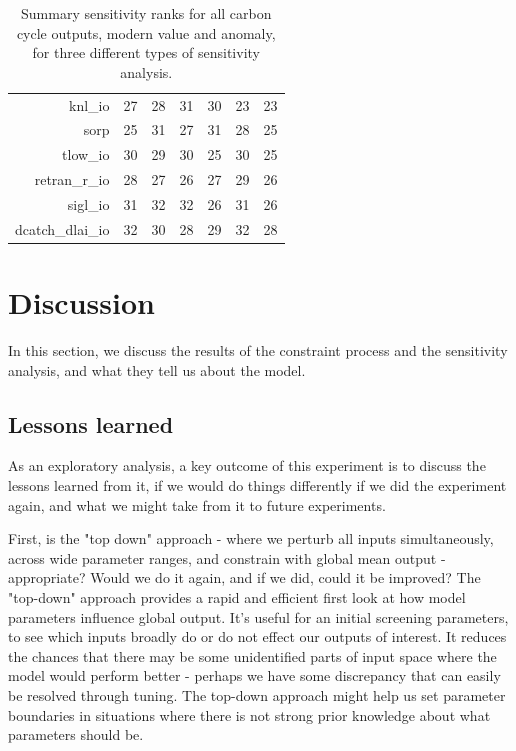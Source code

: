 \documentclass[gmd, manuscript]{copernicus}
\begin{document}
\begin{table}[ht]
\begin{tabular}{rrrrrrr}
  knl\_io & 27 & 28 & 31 & 30 & 23 & 23 \\ 
  sorp & 25 & 31 & 27 & 31 & 28 & 25 \\ 
  tlow\_io & 30 & 29 & 30 & 25 & 30 & 25 \\ 
  retran\_r\_io & 28 & 27 & 26 & 27 & 29 & 26 \\ 
  sigl\_io & 31 & 32 & 32 & 26 & 31 & 26 \\ 
  dcatch\_dlai\_io & 32 & 30 & 28 & 29 & 32 & 28 \\ 
   \hline
\end{tabular}
\caption{Summary sensitivity ranks for all carbon cycle outputs, modern value and anomaly, for three different types of sensitivity analysis.}
\label{tab:sensitivity_ranks}
\end{table}



\section{Discussion}\label{sec:discussion}
In this section, we discuss the results of the constraint process and the sensitivity analysis, and what they tell us about the model.

\subsection{Lessons learned}\label{ssec:lessons}

As an exploratory analysis, a key outcome of this experiment is to discuss the lessons learned from it, if we would do things differently if we did the experiment again, and what we might take from it to future experiments.

First, is the "top down" approach - where we perturb all inputs simultaneously, across wide parameter ranges, and constrain with global mean output - appropriate? Would we do it again, and if we did, could it be improved? The "top-down" approach provides a rapid and efficient first look at how model parameters influence global output. It's useful for an initial screening parameters, to see which inputs broadly do or do not effect our outputs of interest. It reduces the chances that there may be some unidentified parts of input space where the model would perform better - perhaps we have some discrepancy that can easily be resolved through tuning. The top-down approach might help us set parameter boundaries in situations where there is not strong prior knowledge about what parameters should be.
\end{document}
